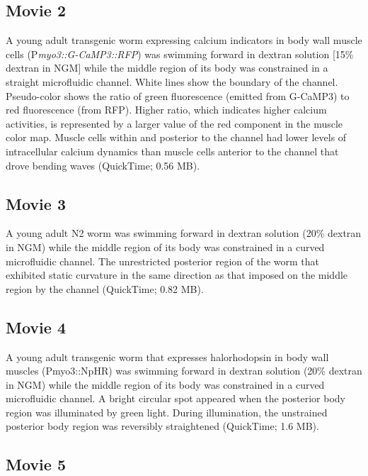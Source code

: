 \subsection{Movie 2}\label{movie:prop2}
 
A young adult transgenic worm expressing calcium indicators in body wall muscle cells 
(P\textit{myo3::G-CaMP3::RFP}) was swimming forward in dextran solution [15\% dextran in NGM] 
while the middle region of its body was constrained in a straight microfluidic channel. White 
lines show the boundary of the channel. Pseudo-color shows the ratio of green fluorescence 
(emitted from G-CaMP3) to red fluorescence (from RFP). Higher ratio, which indicates higher 
calcium activities, is represented by a larger value of the red component in the muscle color map. 
Muscle cells within and posterior to the channel had lower levels of intracellular calcium 
dynamics than muscle cells anterior to the channel that drove bending waves (QuickTime; 0.56 
MB).   
 
\subsection{Movie 3 }\label{movie:prop3}
 
A young adult N2 worm was swimming forward in dextran solution (20\% dextran in NGM) 
while the middle region of its body was constrained in a curved microfluidic channel. The 
unrestricted posterior region of the worm that exhibited static curvature in the same direction as 
that imposed on the middle region by the channel (QuickTime; 0.82 MB). 
 
\subsection{Movie 4 }\label{movie:prop4}
 
A young adult transgenic worm that expresses halorhodopsin in body wall muscles 
(Pmyo3::NpHR) was swimming forward in dextran solution (20\% dextran in NGM) while the 
middle region of its body was constrained in a curved microfluidic channel. A bright circular spot 
appeared when the posterior body region was illuminated by green light. During illumination, the 
unstrained posterior body region was reversibly straightened (QuickTime; 1.6 MB). 
 
\subsection{Movie 5 }\label{movie:prop5}
 
